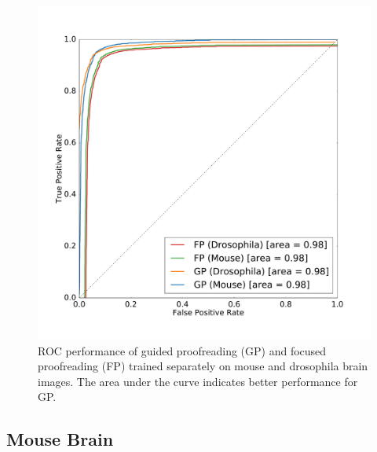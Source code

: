 \begin{figure}[h]
  \vspace{-5mm}
\begin{center}
  \includegraphics[width=\linewidth]{gfx/roc.pdf}
\end{center}
  \vspace{-10mm}
   \caption{ROC performance of guided proofreading (GP) and focused proofreading (FP) trained separately on mouse and drosophila brain images. The area under the curve indicates better performance for GP.}
\label{fig:roc}
\end{figure}

\subsection{Mouse Brain}

